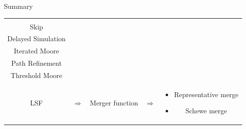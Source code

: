 \begin{frame}{Summary}
\begin{tabular}{ccccc}
\begin{minipage}{0.32\textwidth}
	\begin{itemize}
	\item Moore \\
	\item Skip \\
	\item Delayed Simulation \\
	\item Iterated Moore \\
	\item Path Refinement \\
	\item Threshold Moore \\
	\item LSF
	\end{itemize}
\end{minipage}
&
$\Rightarrow$ 
&
\begin{minipage}{0.11\textwidth}
	Merger function
\end{minipage}
&
$\Rightarrow$
&
\begin{minipage}{0.3\textwidth}
	\begin{itemize}
	\item Representative merge
	\item Schewe merge
	\end{itemize}
\end{minipage}
\end{tabular}






\end{frame}










